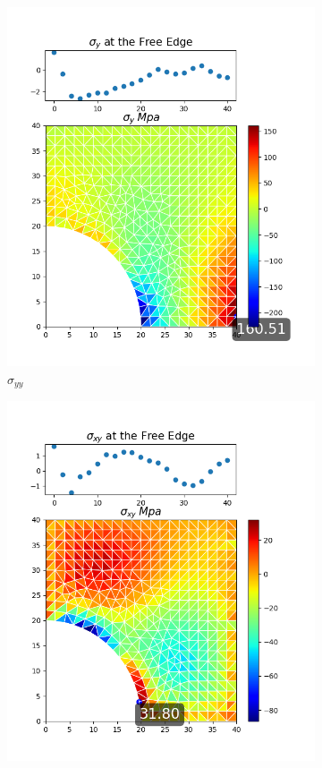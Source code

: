 \documentclass[twoside,twocolumn,10pt]{article}
\begin{document}
\begin{figure}[!ht]
\begin{subfigure}[c]{0.26\textwidth}
    \includegraphics[width=1.\linewidth]{Q2_5/Q5_1_y_triangle.png}
    \caption{$\sigma_{yy}$ }
    \label{fig:y_tri_1}
  \end{subfigure}%
  \hfill
  \begin{subfigure}[c]{0.26\textwidth}
    \includegraphics[width=1.\linewidth]{Q2_5/Q5_1_xy_triangle.png}

\end{subfigure}
\end{figure}
\end{document}
